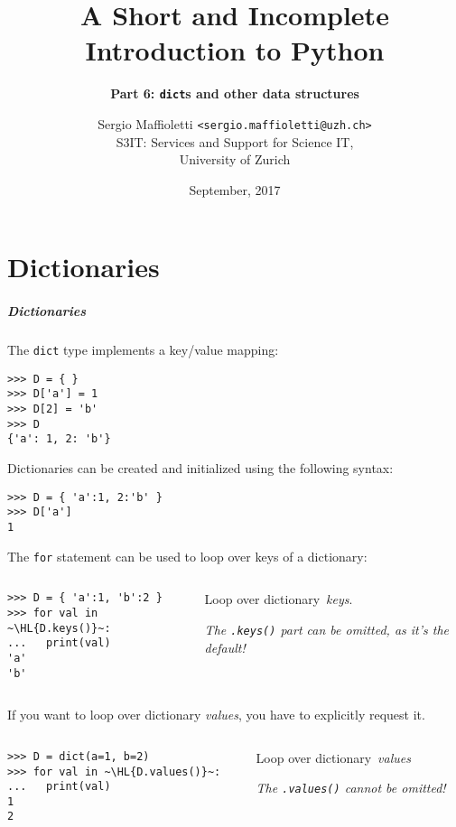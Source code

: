 \documentclass[english,serif,mathserif,xcolor=pdftex,dvipsnames,table]{beamer}
\title[6. Dictionaries]{%
  A Short and Incomplete Introduction to Python
}
\subtitle{\bfseries Part 6: \texttt{dict}s and other data structures}
\author[S.~Maffioletti]{%
  Sergio Maffioletti \texttt{<sergio.maffioletti@uzh.ch>}
  \\
  S3IT: Services and Support for Science IT,
  \\
  University of Zurich
}
\date{September, 2017}
\begin{document}
\maketitle


\part{Dictionaries}


\begin{frame}[fragile]
  \frametitle{Dictionaries}
  The \texttt{dict} type implements a key/value mapping:
\begin{lstlisting}
>>> D = { }
>>> D['a'] = 1
>>> D[2] = 'b'
>>> D
{'a': 1, 2: 'b'}
\end{lstlisting}

\+
  Dictionaries can be created and initialized using the following syntax:
\begin{lstlisting}
>>> D = { 'a':1, 2:'b' }
>>> D['a']
1
\end{lstlisting}
\end{frame}

\begin{frame}[fragile]
  The \texttt{for} statement can be used to loop over keys of a dictionary:
  \+
  \begin{columns}[c]
    \begin{column}{0.5\textwidth}
\begin{lstlisting}
>>> D = { 'a':1, 'b':2 }
>>> for val in ~\HL{D.keys()}~:
...   print(val)
'a'
'b'
\end{lstlisting}
    \end{column}
    \begin{column}{0.4\textwidth}
      \raggedleft
      Loop over dictionary~\emph{keys}.

      \emph{The \texttt{.keys()} part can be omitted, as it's the
        default!}
    \end{column}
  \end{columns}
\end{frame}

\begin{frame}[fragile]
  If you want to loop over dictionary \emph{values}, you have to
  explicitly request it.

  \+
  \begin{columns}[c]
    \begin{column}{0.5\textwidth}
\begin{lstlisting}
>>> D = dict(a=1, b=2)
>>> for val in ~\HL{D.values()}~:
...   print(val)
1
2
\end{lstlisting}
    \end{column}
    \begin{column}{0.4\textwidth}
      \raggedleft
      Loop over dictionary~\emph{values}

      \emph{The \texttt{.values()} cannot be omitted!}
    \end{column}
  \end{columns}
\end{frame}
\end{document}
